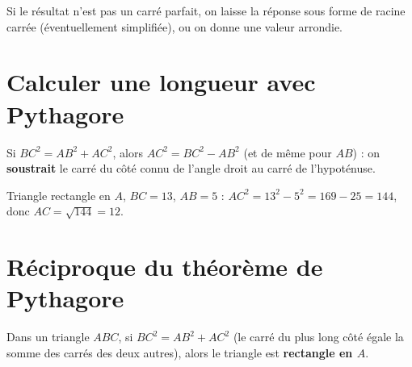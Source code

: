 \begin{remarque}
Si le résultat n'est pas un carré parfait, on laisse la réponse sous forme de racine carrée
(éventuellement simplifiée), ou on donne une valeur arrondie.
\end{remarque}

\section{Calculer une longueur avec Pythagore}

\begin{propriete}
Si $BC^{2}=AB^{2}+AC^{2}$, alors $AC^{2}=BC^{2}-AB^{2}$ (et de même pour $AB$) : on
\textbf{soustrait} le carré du côté connu de l'angle droit au carré de l'hypoténuse.
\end{propriete}

\begin{exemple}
Triangle rectangle en $A$, $BC=13$, $AB=5$ : $AC^{2}=13^{2}-5^{2}=169-25=144$, donc
$AC=\sqrt{144}=12$.
\end{exemple}

\section{Réciproque du théorème de Pythagore}

\begin{propriete}
Dans un triangle $ABC$, si $BC^{2}=AB^{2}+AC^{2}$ (le carré du plus long côté égale la
somme des carrés des deux autres), alors le triangle est \textbf{rectangle en $A$}.
\end{propriete}

\begin{illus}
\end{illus}

